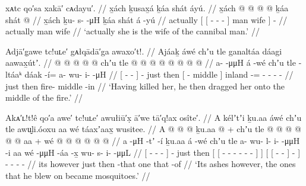 
\ex\label{ex:91-271-actually-cannibal-wife}%
%
\begingl
	\glpreamble	xᴀtc qo′sa xakā′ cᴀdayu′. //
	\glpreamble	x̱ách ḵusax̱á ḵáa shát áyú. //
	\gla	x̱ách {} {}  @ {} @ {} @ {} @ {} {}
			ḵáa shát {}  @ {} //
	\glb	x̱ách {} {} ḵu- s-  -μH {} {}
			ḵáa shát {} á -yú //
	\glc	actually {}[ {}[ - -
			 - \· {}]
			man wife {}]  - //
	\gld	actually {} {}  {} {} {} {} {} 
			man wife {}  {} //
	\glft	‘actually she is the wife of the cannibal man.’
		//
\endgl
\xe

\ex\label{ex:91-272-dragged-onto-fire}%
%
\begingl
	\glpreamble	Adjā′g̣awe tc!uʟe′ gᴀłqādā′ga awaxo′t!. //
	\glpreamble	Ajáaḵ áwé chʼu tle ganaltáa dáagi aawax̱útʼ. //
	\gla	{}  @ {} @ {} @ {} @ {} {}  @ {}
		chʼu tle {}  @ {} @ {} {}
		 @ {} @  @ {} @ {} @ {} @ {} //
	\glb	{} a- {}  -μμH {} {} á -wé
		chʼu tle {} - ltáaᵏ {} {}
		dáak -í= a- wu- i-  -μH //
	\glc	{}[ - \·  - \· {}]
		 -
		just then {}[ - middle \· {}]
		inland -= - - -  - //
	\gld	{}  {} {} {} {} {}  {}
		just then {} fire- middle -in {}
		 {}  {} {} {} {} //
	\glft	‘Having killed her, he then dragged her onto the middle of the fire.’
		//
\endgl
\xe


\ex\label{ex:91-273-ashes-became-mosquitoes}%
%
\begingl
	\glpreamble	Akᴀ′ʟ!t!ê qo′a awe′ tc!uʟe′ awułiū′x̣ ā′we tā′q!ax osîte′. //
	\glpreamble	A kélʼtʼi ḵu.aa áwé chʼu tle awu̬li.óoxu aa wé táaxʼaax̱ wusitee. //
	\gla	{} A  @ {} @ {} @ {} {} ḵu.aa  @ {} +
		chʼu tle {} {}  @ {} @ {} @ {} @ {} @ {} @ {} {} aa {} +
		{} {} wé  @ {} @ {} {} {} {}
		 @ {} @ {} @ {} @ {} //
	\glb	{} a  -μH -tʼ -í {} ḵu.aa á -wé
		chʼu tle {} {} a- wu- l- i-  -μμH -i {} aa {}
		{} {} wé  -μμH -áa {} -x̱ {}
		wu- s- i-  -μμL //
	\glc	{}[   - - - {}]
		  -
		just then {}[ {}[ - - - -
				 - - {}]  {}]
		{}[ {}[   - - {}]
			- {}]
		- - -  - //
	\gld	{} its  {} {} {} {} however  {}
		just then {} {}  {} {} {} {} {} -that {}
			one {}
		{} {} that  {} {} {} -of {}
		 {} {} {} {} //
	\glft	‘Its ashes however, the ones that he blew on became mosquitoes.’
		//
\endgl
\xe

